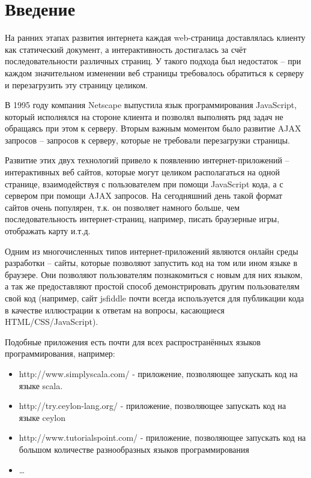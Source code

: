\chapter*{Введение}

	На ранних этапах развития интернета каждая web-страница доставлялась клиенту как статический документ, а интерактивность достигалась за счёт последовательности различных страниц. У такого подхода был недостаток -- при каждом значительном изменении веб страницы требовалось обратиться к серверу и перезагрузить эту страницу целиком. 

	В 1995 году компания Netscape выпустила язык программирования JavaScript, который исполнялся на стороне клиента и позволял выполнять ряд задач не обращаясь при этом к серверу. Вторым важным моментом было развитие AJAX запросов -- запросов к серверу, которые не требовали перезагрузки страницы. 
	
	Развитие этих двух технологий привело к появлению интернет-приложений -- интерактивных веб сайтов, которые могут целиком располагаться на одной странице,  взаимодействуя с пользователем при помощи JavaScript кода, а с сервером при помощи AJAX запросов. На сегодняшний день такой формат сайтов очень популярен, т.к. он позволяет намного больше, чем последовательность интернет-страниц, например, писать браузерные игры, отображать карту и.т.д.
	
	Одним из многочисленных типов интернет-приложений являются онлайн среды разработки -- сайты, которые позволяют запустить код на том или ином языке в браузере. Они позволяют пользователям познакомиться с новым для них языком, а так же предоставляют простой способ демонстрировать другим пользователям свой код (например, сайт jsfiddle почти всегда используется для публикации кода в качестве иллюстрации к ответам на вопросы, касающиеся HTML/CSS/JavaScript).
	
	Подобные приложения есть почти для всех распространённых языков программирования, например:
\begin{itemize}
	\item http://www.simplyscala.com/ - приложение, позволяющее запускать код на языке scala. 
	\item http://try.ceylon-lang.org/ - приложение, позволяющее запускать код на языке ceylon
	\item http://www.tutorialspoint.com/ - приложение, позволяющее запускать код на большом количестве разнообразных языков программирования
	\item \dots
\end{itemize}


